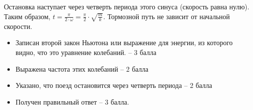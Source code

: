 \begin{enumerate}
    Остановка наступает через четверть периода этого синуса (скорость равна нулю). 
    Таким образом, $t=\frac{\pi}{2 \cdot \omega}=\frac{\pi}{2} \cdot \sqrt{\frac{m}{k}}$. Тормозной путь не зависит от начальной скорости.


    \markSection

    \begin{itemize}
        \item Записан второй закон Ньютона или выражение для энергии, из которого видно, что это уравнение колебаний. – 3 балла
        \item Выражена частота этих колебаний – 2 балла
        \item Указано, что поезд остановится через четверть периода – 2 балла
        \item Получен правильный ответ – 3 балла.
    \end{itemize}
\end{enumerate}